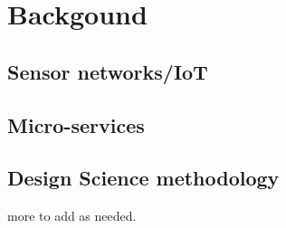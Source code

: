 \chapter{Backgound}
\section{Sensor networks/IoT}
\section{Micro-services}
\section{Design Science methodology}
more to add as needed.
